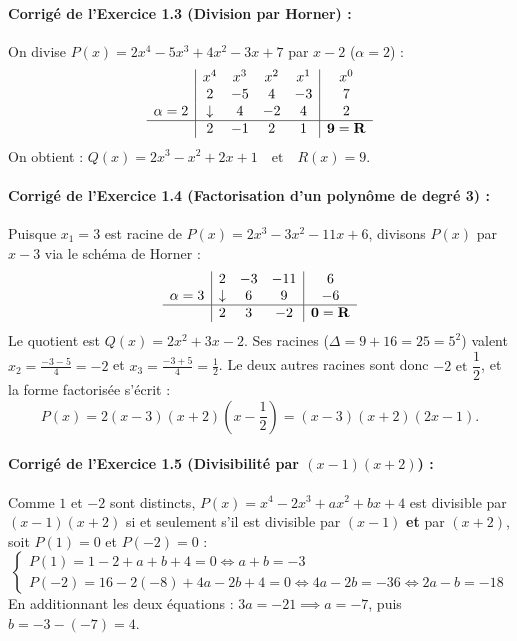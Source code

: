 \paragraph{Corrigé de l'Exercice 1.3 (Division par Horner) :}
On divise $P(x) = 2x^4 - 5x^3 + 4x^2 - 3x + 7$ par $x - 2$ ($\alpha = 2$) :
\[
\begin{array}{c|cccc|c}
    & x^4 & x^3 & x^2 & x^1 & x^0 \\
    & 2 & -5 & 4 & -3 & 7 \\
    \alpha = 2 & \downarrow & 4 & -2 & 4 & 2 \\
    \hline
    & 2 & -1 & 2 & 1 & \mathbf{9 = R}
\end{array}
\]
On obtient : $\boxed{Q(x) = 2x^3 - x^2 + 2x + 1 \quad \text{et} \quad R(x) = 9}$.

\paragraph{Corrigé de l'Exercice 1.4 (Factorisation d'un polynôme de degré 3) :}
Puisque $x_1 = 3$ est racine de $P(x) = 2x^3 - 3x^2 - 11x + 6$, divisons $P(x)$ par $x - 3$ via le schéma de Horner :
\[
\begin{array}{c|ccc|c}
    & 2 & -3 & -11 & 6 \\
    \alpha = 3 & \downarrow & 6 & 9 & -6 \\
    \hline
    & 2 & 3 & -2 & \mathbf{0 = R}
\end{array}
\]
Le quotient est $Q(x) = 2x^2 + 3x - 2$. Ses racines ($\Delta = 9 + 16 = 25 = 5^2$) valent $x_2 = \frac{-3 - 5}{4} = -2$ et $x_3 = \frac{-3 + 5}{4} = \frac{1}{2}$.
Le deux autres racines sont donc $\boxed{-2 \text{ et } \dfrac{1}{2}}$, et la forme factorisée s'écrit :
\[
    \boxed{P(x) = 2(x - 3)(x + 2)\left(x - \frac{1}{2}\right) = (x - 3)(x + 2)(2x - 1)}.
\]

\paragraph{Corrigé de l'Exercice 1.5 (Divisibilité par $(x - 1)(x + 2)$) :}
Comme $1$ et $-2$ sont distincts, $P(x) = x^4 - 2x^3 + ax^2 + bx + 4$ est divisible par $(x - 1)(x + 2)$ si et seulement s'il est divisible par $(x - 1)$ \textbf{et} par $(x + 2)$, soit $P(1) = 0$ et $P(-2) = 0$ :
\[
    \begin{cases}
        P(1) = 1 - 2 + a + b + 4 = 0 \iff a + b = -3 \\
        P(-2) = 16 - 2(-8) + 4a - 2b + 4 = 0 \iff 4a - 2b = -36 \iff 2a - b = -18
    \end{cases}
\]
En additionnant les deux équations : $3a = -21 \implies \boxed{a = -7}$, puis $b = -3 - (-7) = \boxed{4}$.

